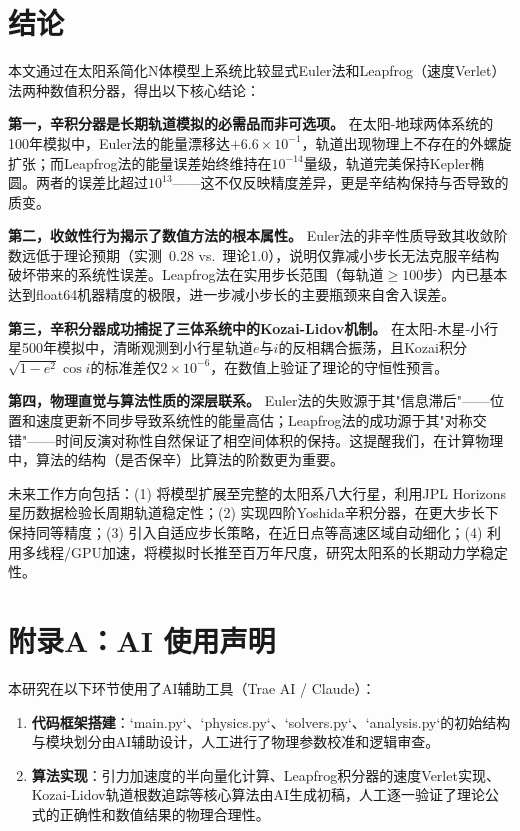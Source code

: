 \documentclass[twocolumn,10pt]{article}
\begin{document}
\section{结论}

本文通过在太阳系简化N体模型上系统比较显式Euler法和Leapfrog（速度Verlet）法两种数值积分器，得出以下核心结论：

\textbf{第一，辛积分器是长期轨道模拟的必需品而非可选项。} 在太阳-地球两体系统的100年模拟中，Euler法的能量漂移达$+6.6\times 10^{-1}$，轨道出现物理上不存在的外螺旋扩张；而Leapfrog法的能量误差始终维持在$10^{-14}$量级，轨道完美保持Kepler椭圆。两者的误差比超过$10^{13}$——这不仅反映精度差异，更是辛结构保持与否导致的质变。

\textbf{第二，收敛性行为揭示了数值方法的根本属性。} Euler法的非辛性质导致其收敛阶数远低于理论预期（实测~0.28 vs.\ 理论1.0），说明仅靠减小步长无法克服辛结构破坏带来的系统性误差。Leapfrog法在实用步长范围（每轨道$\geq 100$步）内已基本达到float64机器精度的极限，进一步减小步长的主要瓶颈来自舍入误差。

\textbf{第三，辛积分器成功捕捉了三体系统中的Kozai-Lidov机制。} 在太阳-木星-小行星500年模拟中，清晰观测到小行星轨道$e$与$i$的反相耦合振荡，且Kozai积分$\sqrt{1-e^2}\cos i$的标准差仅$2\times 10^{-6}$，在数值上验证了理论的守恒性预言。

\textbf{第四，物理直觉与算法性质的深层联系。} Euler法的失败源于其"信息滞后"——位置和速度更新不同步导致系统性的能量高估；Leapfrog法的成功源于其"对称交错"——时间反演对称性自然保证了相空间体积的保持。这提醒我们，在计算物理中，算法的结构（是否保辛）比算法的阶数更为重要。

未来工作方向包括：(1) 将模型扩展至完整的太阳系八大行星，利用JPL Horizons星历数据检验长周期轨道稳定性；(2) 实现四阶Yoshida辛积分器，在更大步长下保持同等精度；(3) 引入自适应步长策略，在近日点等高速区域自动细化；(4) 利用多线程/GPU加速，将模拟时长推至百万年尺度，研究太阳系的长期动力学稳定性。

\section*{附录A：AI 使用声明}

本研究在以下环节使用了AI辅助工具（Trae AI / Claude）：

\begin{enumerate}[nosep]
    \item \textbf{代码框架搭建}：`main.py`、`physics.py`、`solvers.py`、`analysis.py`的初始结构与模块划分由AI辅助设计，人工进行了物理参数校准和逻辑审查。
    \item \textbf{算法实现}：引力加速度的半向量化计算、Leapfrog积分器的速度Verlet实现、Kozai-Lidov轨道根数追踪等核心算法由AI生成初稿，人工逐一验证了理论公式的正确性和数值结果的物理合理性。
\end{enumerate}
\end{document}
